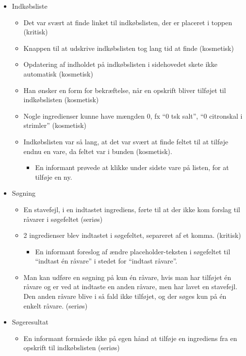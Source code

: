  \begin{itemize}[noitemsep]
 \item Indkøbsliste
  \begin{itemize}[noitemsep]
  \item Det var svært at finde linket til indkøbslisten, der er placeret i toppen (kritisk)
  \item Knappen til at udskrive indkøbslisten tog lang tid at finde (kosmetisk)
  \item Opdatering af indholdet på indkøbslisten i sidehovedet skete ikke automatisk (kosmetisk)
  \item Han ønsker en form for bekræftelse, når en opskrift bliver tilføjet til indkøbslisten (kosmetisk)
  \item Nogle ingredienser kunne have mængden 0, fx “0 tsk salt”, “0 citronskal i strimler” (kosmetisk)
  \item Indkøbslisten var så lang, at det var svært at finde feltet til at tilføje endnu en vare, da feltet var i bunden (kosmetisk).
   \begin{itemize}[noitemsep]
   \item En informant prøvede at klikke under sidste vare på listen, for at tilføje en ny.
   \end{itemize}
  \end{itemize}
 \item Søgning
  \begin{itemize}[noitemsep]
  \item En stavefejl, i en indtastet ingrediens, førte til at der ikke kom forslag til råvarer i søgefeltet (seriøs)
  \item 2 ingredienser blev indtastet i søgefeltet, separeret af et komma. (kritisk)
   \begin{itemize}[noitemsep]
   \item En informant foreslog af ændre placeholder-teksten i søgefeltet til ``indtast én råvare'' i stedet for ``indtast råvare''.
   \end{itemize}
  \item Man kan udføre en søgning på kun én råvare, hvis man har tilføjet én råvare og er ved at indtaste en anden råvare, men har lavet en stavefejl. Den anden råvare blive i så fald ikke tilføjet, og der søges kun på én enkelt råvare. (seriøs)
  \end{itemize}
 \item Søgeresultat
   \begin{itemize}[noitemsep]
  \item En informant formåede ikke på egen hånd at tilføje en ingrediens fra en opskrift til indkøbslisten (seriøs)

\end{itemize}
\end{itemize}
